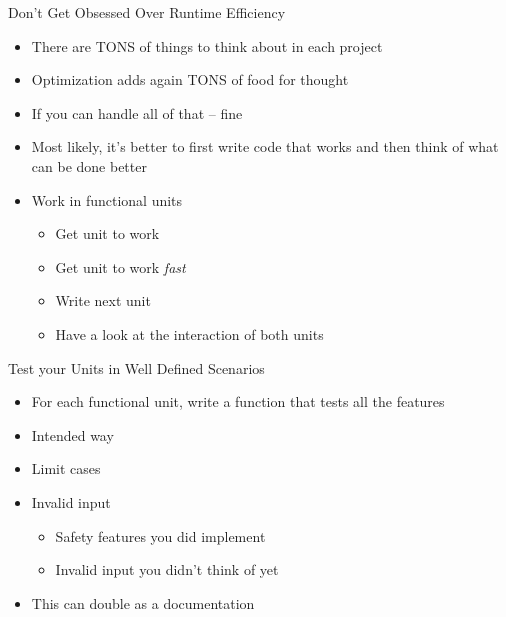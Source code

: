
\begin{frame}{Don't Get Obsessed Over Runtime Efficiency}
%
\begin{itemize}
\item There are TONS of things to think about in each project
\item Optimization adds again TONS of food for thought
\item If you can handle all of that -- fine
\item Most likely, it's better to first write code that works and then think of what can be done better
\item Work in functional units
	\begin{itemize}
	\item Get unit to work
	\item Get unit to work \emph{fast}
	\item Write next unit
	\item Have a look at the interaction of both units
	\end{itemize}
\end{itemize}
%
\end{frame}


\begin{frame}{Test your Units in Well Defined Scenarios}
%
\begin{itemize}
\item For each functional unit, write a function that tests all the features
\item Intended way
\item Limit cases
\item Invalid input
	\begin{itemize}
	\item Safety features you did implement
	\item Invalid input you didn't think of yet
	\end{itemize}
\item This can double as a documentation
\end{itemize}
%
\end{frame}